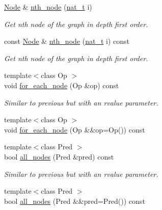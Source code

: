 \begin{DoxyCompactItemize}
\item 
\hyperlink{namespace_designar_a5af326c65aa2bd26b26c410f2030d09e}{Node} \& \hyperlink{class_designar_1_1_base_graph_ae4b7d560477f0b860d127a6ace6956e5}{nth\+\_\+node} (\hyperlink{namespace_designar_aa72662848b9f4815e7bf31a7cf3e33d1}{nat\+\_\+t} i)
\begin{DoxyCompactList}\small\item\em Get nth node of the graph in depth first order. \end{DoxyCompactList}\item 
const \hyperlink{namespace_designar_a5af326c65aa2bd26b26c410f2030d09e}{Node} \& \hyperlink{class_designar_1_1_base_graph_adc03e916cb6246c9eeba181df82fd149}{nth\+\_\+node} (\hyperlink{namespace_designar_aa72662848b9f4815e7bf31a7cf3e33d1}{nat\+\_\+t} i) const
\begin{DoxyCompactList}\small\item\em Get nth node of the graph in depth first order. \end{DoxyCompactList}\item 
{\footnotesize template$<$class Op $>$ }\\void \hyperlink{class_designar_1_1_base_graph_a9497531ac221edb5c5ef19888f78ad3c}{for\+\_\+each\+\_\+node} (Op \&op) const
\begin{DoxyCompactList}\small\item\em Similar to previous but with an rvalue parameter. \end{DoxyCompactList}\item 
{\footnotesize template$<$class Op $>$ }\\void \hyperlink{class_designar_1_1_base_graph_aab8f765719514803f426b03939f519a1}{for\+\_\+each\+\_\+node} (Op \&\&op=Op()) const
\item 
{\footnotesize template$<$class Pred $>$ }\\bool \hyperlink{class_designar_1_1_base_graph_abad9513273c1096aba652e211180061c}{all\+\_\+nodes} (Pred \&pred) const
\begin{DoxyCompactList}\small\item\em Similar to previous but with an rvalue parameter. \end{DoxyCompactList}\item 
{\footnotesize template$<$class Pred $>$ }\\bool \hyperlink{class_designar_1_1_base_graph_a32419ec17712a60c1964bc91e78d135c}{all\+\_\+nodes} (Pred \&\&pred=Pred()) const
\item 

\end{DoxyCompactItemize}
